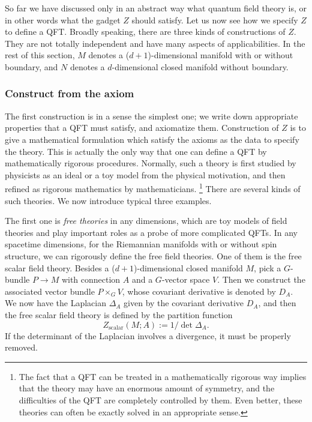 So far we have discussed only in an abstract way what quantum field
theory is, or in other words what the gadget $Z$ should satisfy.
Let us now see how we specify $Z$ to define a QFT. Broadly speaking,
there are three kinds of constructions of $Z$. They are not totally
independent and have many aspects of applicabilities. In the rest
of this section, $M$ denotes a ($d+1$)-dimensional manifold with
or without boundary, and $N$ denotes a $d$-dimensional closed manifold
without boundary.

\subsubsection*{Construct from the axiom}

The first construction is in a sense the simplest one; we write down
appropriate properties that a QFT must satisfy, and axiomatize them.
Construction of $Z$ is to give a mathematical formulation which satisfy
the axioms as the data to specify the theory. This is actually the
only way that one can define a QFT by mathematically rigorous procedures.
Normally, such a theory is first studied by physicists as an ideal
or a toy model from the physical motivation, and then refined as rigorous
mathematics by mathematicians.%
%
\footnote{The fact that a QFT can be treated in a mathematically rigorous way
implies that the theory may have an enormous amount of symmetry, and
the difficulties of the QFT are completely controlled by them. Even
better, these theories can often be exactly solved in an appropriate
sense.}
%
 There are several kinds of such theories. We now introduce typical
three examples.

The first one is \emph{free theories} in any dimensions, which are
toy models of field theories and play important roles as a probe of
more complicated QFTs. In any spacetime dimensions, for the Riemannian
manifolds with or without spin structure, we can rigorously define
the free field theories. One of them is the free scalar field theory.
Besides a ($d+1$)-dimensional closed manifold $M$, pick a $G$-bundle
$P\rightarrow M$ with connection $A$ and a $G$-vector space $V$.
Then we construct the associated vector bundle $P\times_{G}V$, whose
covariant derivative is denoted by $D_{A}$. We now have the Laplacian
$\Delta_{A}$ given by the covariant derivative $D_{A}$, and then
the free scalar field theory is defined by the partition function
\begin{equation}
  Z_{\mathrm{scalar}}\left(M;A\right)  :=  1/\det\Delta_{A}.
\end{equation}
 If the determinant of the Laplacian involves a divergence, it must
be properly removed.

